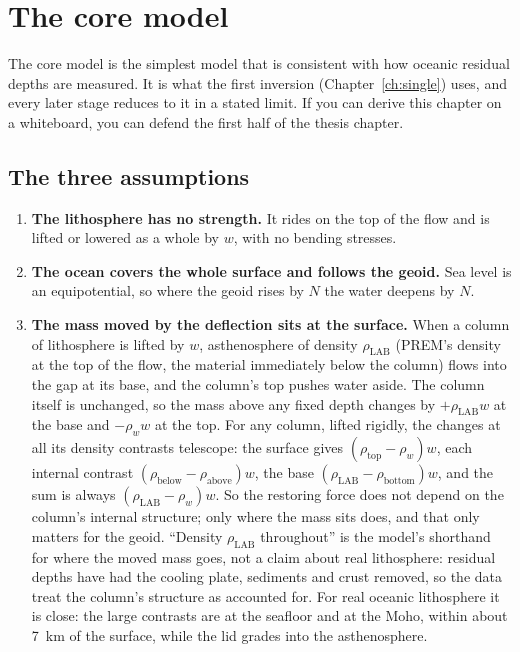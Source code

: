 \chapter{The core model}
\label{ch:core}

The core model is the simplest model that is consistent with how oceanic residual depths are measured.
It is what the first inversion (Chapter~\ref{ch:single}) uses, and every later stage reduces to it in a stated limit.
If you can derive this chapter on a whiteboard, you can defend the first half of the thesis chapter.

\section{The three assumptions}

\begin{enumerate}[nosep]
\item \textbf{The lithosphere has no strength.}
It rides on the top of the flow and is lifted or lowered as a whole by $w$, with no bending stresses.
\item \textbf{The ocean covers the whole surface and follows the geoid.}
Sea level is an equipotential, so where the geoid rises by $N$ the water deepens by $N$.
\item \textbf{The mass moved by the deflection sits at the surface.}
When a column of lithosphere is lifted by $w$, asthenosphere of density $\rho_{\mathrm{LAB}}$ (PREM's density at the top of the flow, the material immediately below the column) flows into the gap at its base, and the column's top pushes water aside.
The column itself is unchanged, so the mass above any fixed depth changes by $+\rho_{\mathrm{LAB}}w$ at the base and $-\rho_w w$ at the top.
For any column, lifted rigidly, the changes at all its density contrasts telescope: the surface gives $(\rho_{\mathrm{top}}-\rho_w)w$, each internal contrast $(\rho_{\mathrm{below}}-\rho_{\mathrm{above}})w$, the base $(\rho_{\mathrm{LAB}}-\rho_{\mathrm{bottom}})w$, and the sum is always $(\rho_{\mathrm{LAB}}-\rho_w)w$.
So the restoring force does not depend on the column's internal structure; only where the mass sits does, and that only matters for the geoid.
``Density $\rho_{\mathrm{LAB}}$ throughout'' is the model's shorthand for where the moved mass goes, not a claim about real lithosphere: residual depths have had the cooling plate, sediments and crust removed, so the data treat the column's structure as accounted for.
For real oceanic lithosphere it is close: the large contrasts are at the seafloor and at the Moho, within about \qty{7}{km} of the surface, while the lid grades into the asthenosphere.

\end{enumerate}
